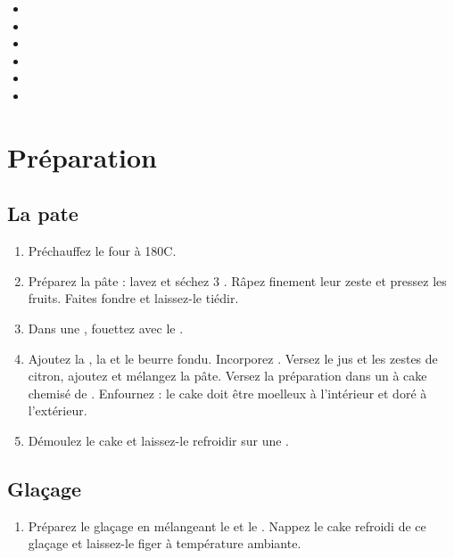 \begin{itemize}[leftmargin=*]
\item {}
\item {}
\item {}
\item {}
\item {}
\item {}
\end{itemize}

\section*{Préparation}

\subsection*{La pate}

\begin{enumerate}
\item Préchauffez le four à 180\textdegree{}C. 
\item Préparez la pâte : lavez et séchez 3 . Râpez finement leur zeste et pressez les fruits. Faites fondre  et laissez-le tiédir.
\item Dans une , fouettez  avec le . 
\item Ajoutez la , la  et le beurre fondu. Incorporez . Versez le jus et les zestes de citron, ajoutez  et mélangez la pâte. Versez la préparation dans un  à cake chemisé de . Enfournez  : le cake doit être moelleux à l'intérieur et doré à l'extérieur. 
\item Démoulez le cake et laissez-le refroidir sur une .
\end{enumerate}

\subsection*{Glaçage}

\begin{enumerate}
\item Préparez le glaçage en mélangeant le  et le . Nappez le cake refroidi de ce glaçage et laissez-le figer à température ambiante.
\end{enumerate}

